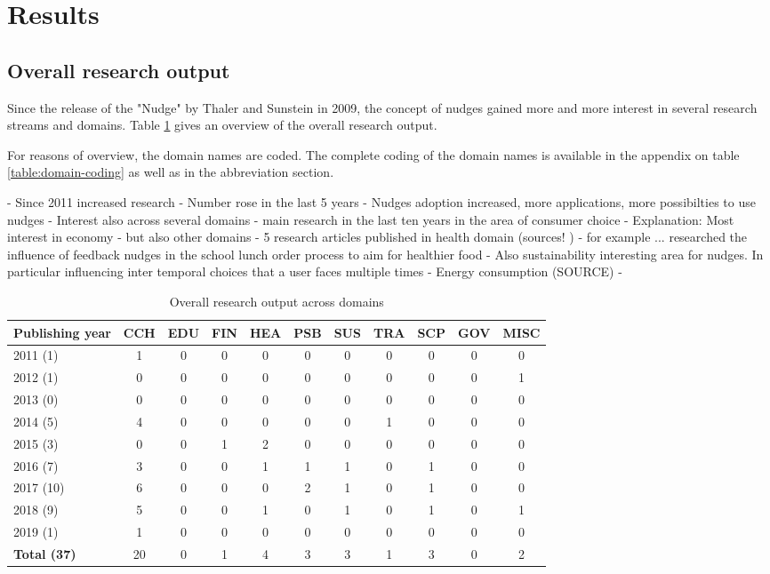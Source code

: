 \section{Results}

\subsection{Overall research output}
Since the release of the "Nudge" by Thaler and Sunstein in 2009, the concept of nudges gained more and more interest in several research streams and domains. Table \ref{table:research-output} gives an overview of the overall research output.

For reasons of overview, the domain names are coded. The complete coding of the domain names is available in the appendix on table \ref{table:domain-coding} as well as in the abbreviation section.

- Since 2011 increased research
- Number rose in the last 5 years
- Nudges adoption increased, more applications, more possibilties to use nudges
- Interest also across several domains
- main research in the last ten years in the area of consumer choice
- Explanation: Most interest in economy
- but also other domains
- 5 research articles published in health domain (sources! )
- for example ... researched the influence of feedback nudges in the school lunch order process to aim for healthier food
- Also sustainability interesting area for nudges. In particular influencing inter temporal choices that a user faces multiple times
- Energy consumption (SOURCE)
- 

\begin{table}[htbp]
\centering
\small
\begin{tabular}{l|cccccccccc}
\textbf{Publishing year} & \textbf{CCH} & \textbf{EDU} & \textbf{FIN} & \textbf{HEA} & \textbf{PSB} & \textbf{SUS} & \textbf{TRA} & \textbf{SCP} & \textbf{GOV} & \textbf{MISC} \\ \hline
2011 (1) & 1 & 0 & 0 & 0 & 0 & 0 & 0 & 0 & 0 &  0 \\
2012 (1) & 0 & 0 & 0 & 0 & 0 & 0 & 0 & 0 & 0 & 1 \\
2013 (0) & 0 & 0 & 0 & 0 & 0 & 0 & 0 & 0 & 0 & 0 \\
2014 (5) & 4 & 0 & 0 & 0 & 0 & 0 & 1 & 0 & 0 & 0 \\
2015 (3) & 0 & 0 & 1 & 2 & 0 & 0 & 0 & 0 & 0 & 0 \\
2016 (7) & 3 & 0 & 0 & 1 & 1 & 1 & 0 & 1 & 0 & 0 \\
2017 (10) & 6 & 0 & 0 & 0 & 2 & 1 & 0 & 1 & 0 & 0 \\
2018 (9) & 5 & 0 & 0 & 1 & 0 & 1 & 0 & 1 & 0 & 1 \\
2019 (1) & 1 & 0 & 0 & 0 & 0 & 0 & 0 & 0 & 0 & 0 \\ \hline
\textbf{Total (37)} & 20 & 0 & 1 & 4 & 3 & 3 & 1 & 3 & 0 & 2
\end{tabular}
\caption{Overall research output across domains}
\label{table:research-output}
\end{table}

